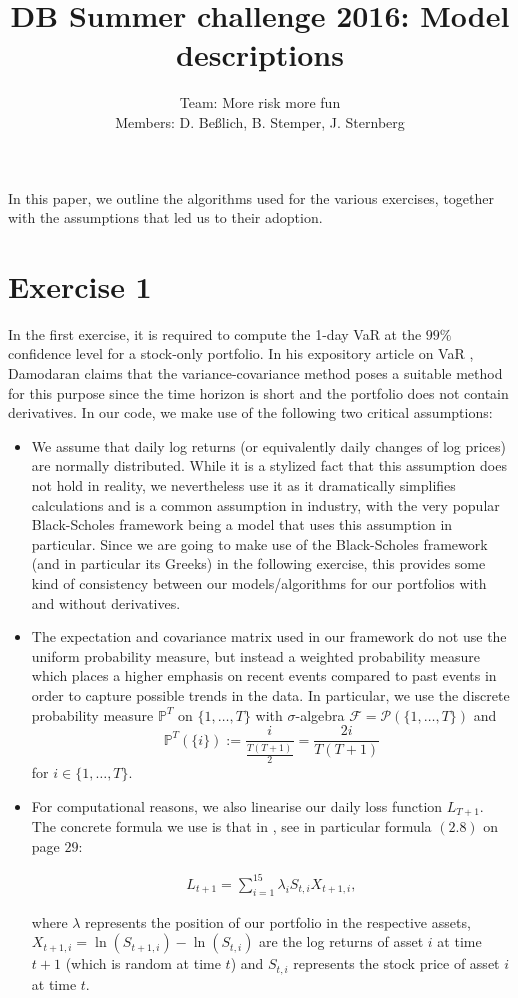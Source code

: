 \documentclass[10pt,a4paper]{article}
\title{DB Summer challenge 2016: Model descriptions}
\author{Team: More risk more fun \\
		Members: D. Be{\ss}lich,  B. Stemper, J. Sternberg}
\theoremstyle{definition}
\begin{document}
	
	\maketitle
	
	In this paper, we outline the algorithms used for the various exercises, together with the assumptions that led us to their adoption.
	
	\section*{Exercise 1}
	
	In the first exercise, it is required to compute the 1-day VaR at the $99\%$ confidence level for a stock-only portfolio. In his expository article on VaR \cite{Damodaran}, Damodaran claims that the variance-covariance method poses a suitable method for this purpose since the time horizon is short and the portfolio does not contain derivatives. In our code, we make use of the following two critical assumptions:
	
	\begin{itemize}
	
	\item We assume that daily log returns (or equivalently daily changes of log prices)
	 are normally distributed. While it is a stylized fact that this assumption does not 
	 hold in reality, we nevertheless use it as it dramatically simplifies calculations
	  and is a common assumption in industry, with the very popular Black-Scholes 
	  framework being a model that uses this assumption in particular. Since we are
	   going to make use of the Black-Scholes framework (and in particular its Greeks) 
	   in the following exercise, this provides some kind of consistency between our
	    models/algorithms for our portfolios with and without derivatives.
	    
	\item The expectation and covariance matrix used in our framework do not use the uniform probability measure, 
	but instead a weighted probability measure which places a higher emphasis on recent events compared to past events in order to capture possible trends in the data. In particular, we use the discrete probability measure $\mathbb{P}^T$ on $\{1,\dots,T\}$ with $\sigma$-algebra $\mathcal{F}=\mathcal{P}(\{1,\dots,T\})$ and
	\[
		\mathbb{P}^T(\{i\}):=\frac{i}{\frac{T(T+1)}{2}}=\frac{2i}{T(T+1)}
	\]
	for $i\in \{1,\dots,T\}$.

	
	\item For computational reasons, we also linearise our daily loss function $L_{T+1}$. The concrete formula we use is that in \cite{QRM}, see in particular formula $(2.8)$ on page $29$:
	
	\begin{align*}
	L_{t+1} = \sum_{i=1}^{15} \lambda_i S_{t,i}X_{t+1,i},
	\end{align*}
	
	where $\lambda$ represents the position of our portfolio in the respective assets, 
	$X_{t+1,i}=\ln(S_{t+1,i})-\ln(S_{t,i})$ are
	the log returns of asset $i$ at time $t+1$ (which is random at time $t$) 
	and $S_{t,i}$ represents the stock price of asset $i$ at time $t$.
	\end{itemize}
	
\end{document}
